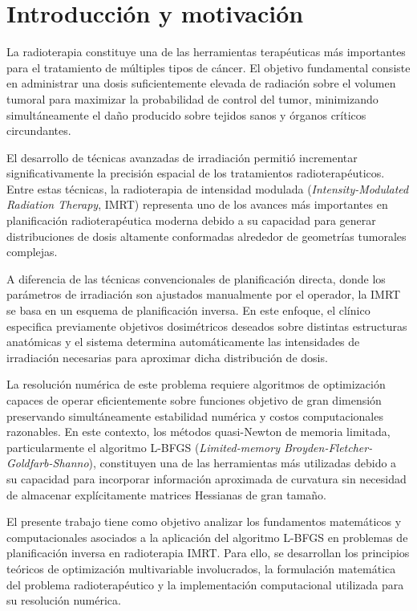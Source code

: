 \section{Introducción y motivación}

La radioterapia constituye una de las herramientas terapéuticas más importantes para el tratamiento de múltiples tipos de cáncer. El objetivo fundamental consiste en administrar una dosis suficientemente elevada de radiación sobre el volumen tumoral para maximizar la probabilidad de control del tumor, minimizando simultáneamente el daño producido sobre tejidos sanos y órganos críticos circundantes.

El desarrollo de técnicas avanzadas de irradiación permitió incrementar significativamente la precisión espacial de los tratamientos radioterapéuticos. Entre estas técnicas, la radioterapia de intensidad modulada (\textit{Intensity-Modulated Radiation Therapy}, IMRT) representa uno de los avances más importantes en planificación radioterapéutica moderna debido a su capacidad para generar distribuciones de dosis altamente conformadas alrededor de geometrías tumorales complejas.

A diferencia de las técnicas convencionales de planificación directa, donde los parámetros de irradiación son ajustados manualmente por el operador, la IMRT se basa en un esquema de planificación inversa. En este enfoque, el clínico especifica previamente objetivos dosimétricos deseados sobre distintas estructuras anatómicas y el sistema determina automáticamente las intensidades de irradiación necesarias para aproximar dicha distribución de dosis.

La resolución numérica de este problema requiere algoritmos de optimización capaces de operar eficientemente sobre funciones objetivo de gran dimensión preservando simultáneamente estabilidad numérica y costos computacionales razonables. En este contexto, los métodos quasi-Newton de memoria limitada, particularmente el algoritmo L-BFGS (\textit{Limited-memory Broyden-Fletcher-Goldfarb-Shanno}), constituyen una de las herramientas más utilizadas debido a su capacidad para incorporar información aproximada de curvatura sin necesidad de almacenar explícitamente matrices Hessianas de gran tamaño.

El presente trabajo tiene como objetivo analizar los fundamentos matemáticos y computacionales asociados a la aplicación del algoritmo L-BFGS en problemas de planificación inversa en radioterapia IMRT. Para ello, se desarrollan los principios teóricos de optimización multivariable involucrados, la formulación matemática del problema radioterapéutico y la implementación computacional utilizada para su resolución numérica.